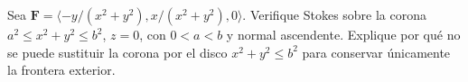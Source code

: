 ﻿Sea $\mathbf F=\langle-y/(x^2+y^2),x/(x^2+y^2),0\rangle$. Verifique Stokes sobre la corona $a^2\leq x^2+y^2\leq b^2$, $z=0$, con $0<a<b$ y normal ascendente. Explique por qué no se puede sustituir la corona por el disco $x^2+y^2\leq b^2$ para conservar únicamente la frontera exterior.
